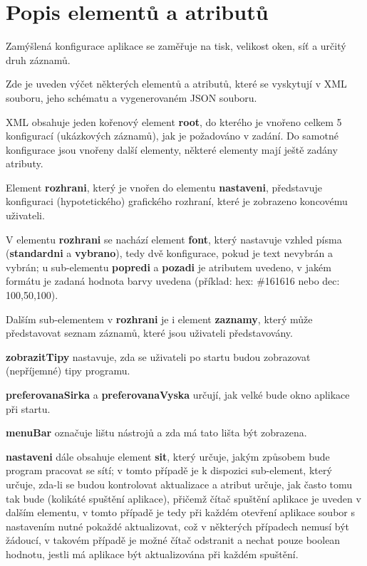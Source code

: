 \documentclass[czech]{article}
\begin{document}
\section{Popis elementů a atributů}

Zamýšlená konfigurace aplikace se zaměřuje na tisk, velikost oken,
síť a určitý druh záznamů.

Zde je uveden výčet některých elementů a atributů, které se vyskytují
v XML souboru, jeho schématu a vygenerovaném JSON souboru.

XML obsahuje jeden kořenový element \textquotedbl{}\textbf{root}\textquotedbl{},
do kterého je vnořeno celkem 5 konfigurací (ukázkových záznamů), jak
je požadováno v zadání. Do samotné konfigurace jsou vnořeny další
elementy, některé elementy mají ještě zadány atributy.

Element \textquotedbl{}\textbf{rozhrani}\textquotedbl{}, který je
vnořen do elementu \textquotedbl{}\textbf{nastaveni}\textquotedbl{},
představuje konfiguraci (hypotetického) grafického rozhraní, které
je zobrazeno koncovému uživateli.

V elementu \textquotedbl{}\textbf{rozhrani}\textquotedbl{} se nachází
element \textquotedbl{}\textbf{font}\textquotedbl{}, který nastavuje
vzhled písma (\textquotedbl{}\textbf{standardni}\textquotedbl{} a
\textquotedbl{}\textbf{vybrano}\textquotedbl{}), tedy dvě konfigurace,
pokud je text nevybrán a vybrán; u sub-elementu \textquotedbl{}\textbf{popredi}\textquotedbl{}
a \textquotedbl{}\textbf{pozadi}\textquotedbl{} je atributem uvedeno,
v jakém formátu je zadaná hodnota barvy uvedena (příklad: hex: \#161616
nebo dec: 100,50,100).

Dalším sub-elementem v \textquotedbl{}\textbf{rozhrani}\textquotedbl{}
je i element \textquotedbl{}\textbf{zaznamy}\textquotedbl{}, který
může představovat seznam záznamů, které jsou uživateli představovány.

\textquotedbl{}\textbf{zobrazitTipy}\textquotedbl{} nastavuje, zda
se uživateli po startu budou zobrazovat (nepříjemné) tipy programu.

\textquotedbl{}\textbf{preferovanaSirka}\textquotedbl{} a \textquotedbl{}\textbf{preferovanaVyska}\textquotedbl{}
určují, jak velké bude okno aplikace při startu.

\textquotedbl{}\textbf{menuBar}\textquotedbl{} označuje lištu nástrojů
a zda má tato lišta být zobrazena.

\textquotedbl{}\textbf{nastaveni}\textquotedbl{} dále obsahuje element
\textquotedbl{}\textbf{sit}\textquotedbl{}, který určuje, jakým způsobem
bude program pracovat se sítí; v tomto případě je k dispozici sub-element,
který určuje, zda-li se budou kontrolovat aktualizace a atribut určuje,
jak často tomu tak bude (kolikáté spuštění aplikace), přičemž čítač
spuštění aplikace je uveden v dalším elementu, v tomto případě je
tedy při každém otevření aplikace soubor s nastavením nutné pokaždé
aktualizovat, což v některých případech nemusí být žádoucí, v takovém
případě je možné čítač odstranit a nechat pouze boolean hodnotu, jestli
má aplikace být aktualizována při každém spuštění. 
\end{document}
